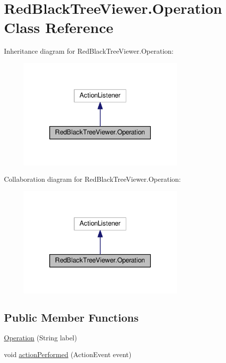 \hypertarget{class_red_black_tree_viewer_1_1_operation}{}\section{Red\+Black\+Tree\+Viewer.\+Operation Class Reference}
\label{class_red_black_tree_viewer_1_1_operation}


Inheritance diagram for Red\+Black\+Tree\+Viewer.\+Operation\+:
\nopagebreak
\begin{figure}[H]
\begin{center}
\leavevmode
\includegraphics[width=234pt]{class_red_black_tree_viewer_1_1_operation__inherit__graph}
\end{center}
\end{figure}


Collaboration diagram for Red\+Black\+Tree\+Viewer.\+Operation\+:
\nopagebreak
\begin{figure}[H]
\begin{center}
\leavevmode
\includegraphics[width=234pt]{class_red_black_tree_viewer_1_1_operation__coll__graph}
\end{center}
\end{figure}
\subsection*{Public Member Functions}
\begin{DoxyCompactItemize}
\item 
\hyperlink{class_red_black_tree_viewer_1_1_operation_aac4746a617b8fcd8ae47845020761c24}{Operation} (String label)
\item 
void \hyperlink{class_red_black_tree_viewer_1_1_operation_aeaa75c4da161d56c99ec16f68a2ce300}{action\+Performed} (Action\+Event event)
\end{DoxyCompactItemize}
